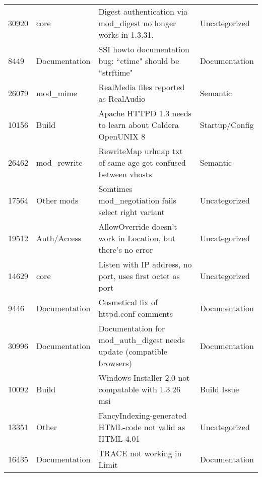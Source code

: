 \begin{longtable}[c]{p{1cm}p{3cm}p{6cm}p{4cm}}
30920  & core               & Digest authentication via mod\_digest no longer works in 1.3.31.                                               & Uncategorized     \\
8449   & Documentation      & SSI howto documentation bug: ``ctime" should be ``strftime"                                                      & Documentation     \\
26079  & mod\_mime          & RealMedia files reported as RealAudio                                                                          & Semantic          \\
10156  & Build              & Apache HTTPD 1.3 needs to learn about Caldera OpenUNIX 8                                                       & Startup/Config    \\
26462  & mod\_rewrite       & RewriteMap urlmap txt of same age get confused between vhosts                                                  & Semantic          \\
17564  & Other mods         & Somtimes mod\_negotiation fails  select right variant                                                          & Uncategorized     \\
19512  & Auth/Access        & AllowOverride doesn't work in Location, but there's no error                              & Uncategorized     \\
14629  & core               & Listen with IP address, no port, uses first octet as port                                                      & Uncategorized     \\
9446   & Documentation      & Cosmetical fix of httpd.conf comments                                                                          & Documentation     \\
30996  & Documentation      & Documentation for mod\_auth\_digest needs update (compatible browsers)                                         & Documentation     \\
10092  & Build              & Windows Installer 2.0 not compatable with 1.3.26 msi                                                           & Build Issue       \\
13351  & Other              & FancyIndexing-generated HTML-code not valid as HTML 4.01                                                       & Uncategorized     \\
16435  & Documentation      & TRACE not working in Limit                                                                & Documentation     \\

\end{longtable}
